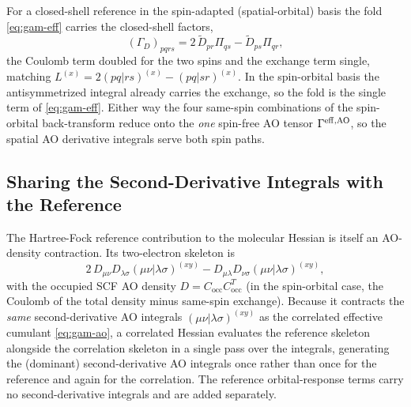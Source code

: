 \documentclass[12pt]{article}
\newcommand{\occ}{\text{occ}}
\begin{document}
For a closed-shell reference in the spin-adapted (spatial-orbital) basis the fold
\eqref{eq:gam-eff} carries the closed-shell factors,
\begin{equation}
(\Gamma_D)_{pqrs} = 2\,\tilde D_{pr}\Pi_{qs} - \tilde D_{ps}\Pi_{qr},
\end{equation}
the Coulomb term doubled for the two spins and the exchange term single, matching
$L^{(x)}=2(pq|rs)^{(x)}-(pq|sr)^{(x)}$.  In the spin-orbital basis the antisymmetrized
integral already carries the exchange, so the fold is the single term of
\eqref{eq:gam-eff}.  Either way the four same-spin combinations of the spin-orbital
back-transform reduce onto the {\em one} spin-free AO tensor $\Gamma^{\rm eff,AO}$, so
the spatial AO derivative integrals serve both spin paths.

\subsection{Sharing the Second-Derivative Integrals with the Reference}

The Hartree-Fock reference contribution to the molecular Hessian is itself an
AO-density contraction.  Its two-electron skeleton is
\begin{equation}
2\,D_{\mu\nu}D_{\lambda\sigma}(\mu\nu|\lambda\sigma)^{(xy)}
- D_{\mu\lambda}D_{\nu\sigma}(\mu\nu|\lambda\sigma)^{(xy)},
\end{equation}
with the occupied SCF AO density $D=C_{\occ}C_{\occ}^{T}$ (in the spin-orbital case,
the Coulomb of the total density minus same-spin exchange).  Because it contracts the
{\em same} second-derivative AO integrals $(\mu\nu|\lambda\sigma)^{(xy)}$ as the
correlated effective cumulant \eqref{eq:gam-ao}, a correlated Hessian evaluates the
reference skeleton alongside the correlation skeleton in a single pass over the
integrals, generating the (dominant) second-derivative AO integrals once rather than
once for the reference and again for the correlation.  The reference orbital-response
terms carry no second-derivative integrals and are added separately.
\end{document}
